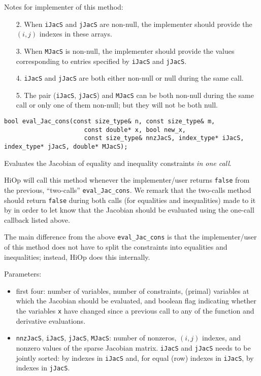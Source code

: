 Notes for implementer of this method: 
\begin{itemize}
\item[2.] When \texttt{iJacS} and \texttt{jJacS} are non-null, the implementer should provide the $(i,j)$   indexes in these arrays. 
\item[3.] When \texttt{MJacS} is non-null, the implementer should provide the values corresponding to    entries specified by \texttt{iJacS} and \texttt{jJacS}.
\item[4.] \texttt{iJacS} and \texttt{jJacS} are both either non-null or null during the same call.
\item[5.] The pair (\texttt{iJacS}, \texttt{jJacS}) and \texttt{MJacS} can be both non-null during the same call or only one of them  non-null; but they will not be both null.
\end{itemize}

\begin{lstlisting}
bool eval_Jac_cons(const size_type& n, const size_type& m, 
			          const double* x, bool new_x,
			          const size_type& nnzJacS, index_type* iJacS, index_type* jJacS, double* MJacS);
\end{lstlisting} 

\noindent Evaluates the Jacobian of equality and inequality constraints \textit{in one call}. 
   
   HiOp will call this method whenever the implementer/user returns \texttt{false} from the previous, ``two-calls'' \texttt{eval\_Jac\_cons}. We remark that the two-calls method should return  \texttt{false} during both calls (for equalities and inequalities) made to it by \Hi in order to let \Hi know that the Jacobian should be evaluated using the one-call callback listed above.
   
   
   
The main difference from the above \texttt{eval\_Jac\_cons} is that the implementer/user of this 
    method does not have to split the constraints into equalities and inequalities; instead,
    HiOp does this internally.
   
 
   Parameters:
    \begin{itemize}
    \item  first four: number of variables, number of constraints, (primal) variables at which the
    Jacobian should be evaluated, and boolean flag indicating whether the variables \texttt{x} have
    changed since a previous call to any of the function and derivative evaluations.
     \item   \texttt{nnzJacS}, \texttt{iJacS}, \texttt{jJacS}, \texttt{MJacS}: number of nonzeros, $(i,j)$ indexes, and nonzero values of 
   the sparse Jacobian matrix.  \texttt{iJacS} and \texttt{jJacS} needs to be jointly sorted: by indexes in \texttt{iJacS} and, for equal (row) indexes in \texttt{iJacS}, by indexes in \texttt{jJacS}.
    \end{itemize}
   
